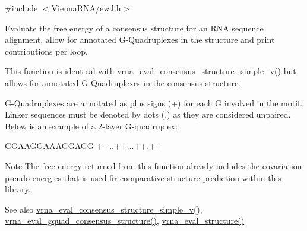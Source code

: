 {\ttfamily \#include $<$\mbox{\hyperlink{eval_8h}{Vienna\+R\+N\+A/eval.\+h}}$>$}



Evaluate the free energy of a consensus structure for an R\+NA sequence alignment, allow for annotated G-\/\+Quadruplexes in the structure and print contributions per loop. 

This function is identical with \mbox{\hyperlink{group__eval_gad88927c62ab0a8b534e078e44be1b36e}{vrna\+\_\+eval\+\_\+consensus\+\_\+structure\+\_\+simple\+\_\+v()}} but allows for annotated G-\/\+Quadruplexes in the consensus structure.

G-\/\+Quadruplexes are annotated as plus signs (\textquotesingle{}+\textquotesingle{}) for each G involved in the motif. Linker sequences must be denoted by dots (\textquotesingle{}.\textquotesingle{}) as they are considered unpaired. Below is an example of a 2-\/layer G-\/quadruplex\+: 
\begin{DoxyCode}
GGAAGGAAAGGAGG
++..++...++.++
\end{DoxyCode}


\begin{DoxyNote}{Note}
The free energy returned from this function already includes the covariation pseudo energies that is used fir comparative structure prediction within this library.
\end{DoxyNote}
\begin{DoxySeeAlso}{See also}
\mbox{\hyperlink{group__eval_gad88927c62ab0a8b534e078e44be1b36e}{vrna\+\_\+eval\+\_\+consensus\+\_\+structure\+\_\+simple\+\_\+v()}}, \mbox{\hyperlink{group__eval_gaf09a326b3d57a4b30c27bd0e216198ac}{vrna\+\_\+eval\+\_\+gquad\+\_\+consensus\+\_\+structure()}}, \mbox{\hyperlink{group__eval_ga58f199f1438d794a265f3b27fc8ea631}{vrna\+\_\+eval\+\_\+structure()}}
\end{DoxySeeAlso}

